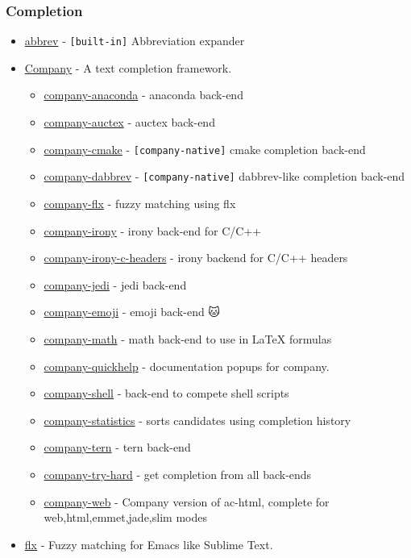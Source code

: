 \documentclass[11pt]{article}
\begin{document}
\subsubsection{Completion}
\label{sec-1-6-1}
\begin{itemize}
\item \href{http://www.emacswiki.org/emacs/AbbrevMode}{abbrev} - \texttt{[built-in]} Abbreviation expander
\item \href{https://company-mode.github.io/}{Company} - A text completion framework.
\begin{itemize}
\item \href{https://github.com/proofit404/company-anaconda}{company-anaconda} - anaconda back-end
\item \href{https://github.com/alexeyr/company-auctex}{company-auctex} - auctex back-end
\item \href{https://company-mode.github.io/}{company-cmake} - \texttt{[company-native]} cmake completion back-end
\item \href{https://company-mode.github.io/}{company-dabbrev} - \texttt{[company-native]} dabbrev-like completion back-end
\item \href{https://github.com/PythonNut/company-flx}{company-flx} - fuzzy matching using flx
\item \href{https://github.com/Sarcasm/company-irony}{company-irony} - irony back-end for C/C++
\item \href{https://github.com/hotpxl/company-irony-c-headers}{company-irony-c-headers} - irony backend for C/C++ headers
\item \href{https://github.com/syohex/emacs-company-jedi}{company-jedi} - jedi back-end
\item \href{https://github.com/dunn/company-emoji}{company-emoji} - emoji back-end 🐱
\item \href{https://github.com/vspinu/company-math}{company-math} - math back-end to use in \LaTeX{} formulas
\item \href{https://github.com/expez/company-quickhelp}{company-quickhelp} - documentation popups for company.
\item \href{https://github.com/Alexander-Miller/company-shell}{company-shell} - back-end to compete shell scripts
\item \href{https://github.com/company-mode/company-statistics}{company-statistics} - sorts candidates using completion history
\item \href{https://github.com/proofit404/company-tern}{company-tern} - tern back-end
\item \href{https://github.com/Wilfred/company-try-hard}{company-try-hard} - get completion from all back-ends
\item \href{https://github.com/osv/company-web}{company-web} - Company version of ac-html, complete for web,html,emmet,jade,slim modes
\end{itemize}
\item \href{https://github.com/lewang/flx}{flx} - Fuzzy matching for Emacs like Sublime Text.
\end{itemize}
\end{document}
